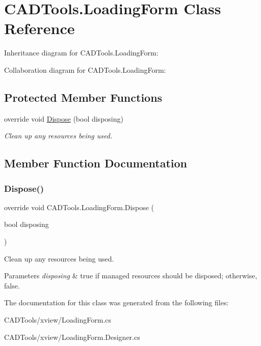 \hypertarget{class_c_a_d_tools_1_1_loading_form}{}\section{C\+A\+D\+Tools.\+Loading\+Form Class Reference}
\label{class_c_a_d_tools_1_1_loading_form}


Inheritance diagram for C\+A\+D\+Tools.\+Loading\+Form\+:


Collaboration diagram for C\+A\+D\+Tools.\+Loading\+Form\+:
\subsection*{Protected Member Functions}
\begin{DoxyCompactItemize}
\item 
override void \mbox{\hyperlink{class_c_a_d_tools_1_1_loading_form_a4a5fba20eea96605a0efebcce4ca8496}{Dispose}} (bool disposing)
\begin{DoxyCompactList}\small\item\em Clean up any resources being used. \end{DoxyCompactList}\end{DoxyCompactItemize}


\subsection{Member Function Documentation}
\mbox{\label{class_c_a_d_tools_1_1_loading_form_a4a5fba20eea96605a0efebcce4ca8496}} 
\subsubsection{\texorpdfstring{Dispose()}{Dispose()}}
{\footnotesize\ttfamily override void C\+A\+D\+Tools.\+Loading\+Form.\+Dispose (\begin{DoxyParamCaption}\item[{bool}]{disposing }\end{DoxyParamCaption})\hspace{0.3cm}{\ttfamily [protected]}}



Clean up any resources being used. 


\begin{DoxyParams}{Parameters}
{\em disposing} & true if managed resources should be disposed; otherwise, false.\\
\hline
\end{DoxyParams}


The documentation for this class was generated from the following files\+:\begin{DoxyCompactItemize}
\item 
C\+A\+D\+Tools/xview/Loading\+Form.\+cs\item 
C\+A\+D\+Tools/xview/Loading\+Form.\+Designer.\+cs\end{DoxyCompactItemize}
